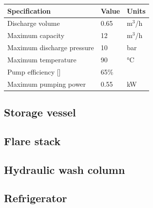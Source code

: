 \begin{table}[H]
\centering
\begin{tabular}{@{}l|l|l@{}}
\toprule
\textbf{Specification}                    & \textbf{Value} & \textbf{Units} \\ \midrule
Discharge volume                              & 0.65            & m$^3$/h            \\ \midrule
Maximum capacity                  & 12       &  m$^3$/h       \\ \midrule
Maximum discharge pressure       & 10         &     bar           \\ \midrule
Maximum temperature                  & 90     & °C         \\ \midrule
Pump efficiency []               & 65\%         &            \\ \midrule
Maximum pumping power                     & 0.55     & kW           \\ \bottomrule
\end{tabular}
\end{table}

\newpage
\subsection{Storage vessel}

\newpage
\subsection{Flare stack}

\newpage
\subsection{Hydraulic wash column}

\newpage
\subsection{Refrigerator}


